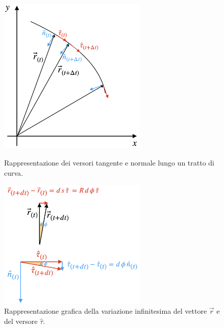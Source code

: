 \begin{figure}[htbp]
    \begin{minipage}[b]{0.47\textwidth}
        \centering
            \includegraphics[width=7cm]{images/coordcurv.png}
            \caption{Rappresentazione dei versori tangente e normale lungo un tratto di curva.}
    \label{fig:curvilines}
    \end{minipage}
    \hfill
    \begin{minipage}[b]{0.47\textwidth}
        \centering
            \includegraphics[width=7cm]{images/drdtau.png}
            \caption{Rappresentazione grafica della variazione infinitesima del vettore $\vec r$ e del versore $\hat\tau$.}
    \label{fig:drdtau}
    \end{minipage}
    \hfill
\end{figure}

